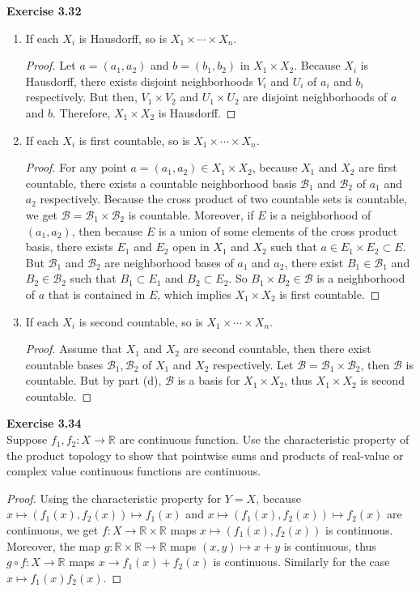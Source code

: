 \documentclass[12pt, a4paper]{article}
\theoremstyle{plain}
\newcommand{\B}{\mathscr{B}}
\newcommand{\R}{\mathbb{R}}
\newenvironment{exercise}[2][Exercise]
    { \begin{mdframed}[backgroundcolor=gray!20] \textbf{#1 #2} \\}
    {  \end{mdframed}}
\begin{document}
\begin{exercise}{3.32}
\begin{enumerate}[label=(\alph*)]
\begin{proof}
	\end{proof}

\item If each $X_i$ is Hausdorff, so is $X_1\times\cdots\times X_n$.
	\begin{proof}
	Let $a=(a_1,a_2)$ and $b=(b_1,b_2)$ in $X_1\times X_2$. Because $X_i$ is Hausdorff, there exists disjoint neighborhoods $V_i$ and $U_i$ of $a_i$ and $b_i$ respectively. But then, $V_1\times V_2$ and $U_1\times U_2$ are disjoint neighborhoods of $a$ and $b$. Therefore, $X_1\times X_2$ is Hausdorff.
	\end{proof}

\item If each $X_i$ is first countable, so is $X_1\times\cdots\times X_n$.
	\begin{proof}
	For any point $a=(a_1,a_2)\in X_1\times X_2$, because $X_1$ and $X_2$ are first countable, there exists a countable neighborhood basis $\B_1$ and $\B_2$ of $a_1$ and $a_2$ respectively. Because the cross product of two countable sets is countable, we get $\B=\B_1\times \B_2$ is countable. Moreover, if $E$ is a neighborhood of $(a_1,a_2)$, then because $E$ is a union of some elements of the cross product basis, there exists $E_1$ and $E_2$ open in $X_1$ and $X_2$ such that $a\in E_1\times E_2\subset E$. But $\B_1$ and $\B_2$ are neighborhood bases of $a_1$ and $a_2$, there exist $B_1\in\B_1$ and $B_2\in\B_2$ such that $B_1\subset E_1$ and $B_2\subset E_2$. So $B_1\times B_2\in\B$ is a neighborhood of $a$ that is contained in $E$, which implies $X_1\times X_2$ is first countable.
	\end{proof}

\item If each $X_i$ is second countable, so is $X_1\times\cdots\times X_n$.
	\begin{proof}
	Assume that $X_1$ and $X_2$ are second countable, then there exist countable bases $\B_1,\B_2$ of $X_1$ and $X_2$ respectively. Let $\B=\B_1\times \B_2$, then $\B$ is countable. But by part (d), $\B$ is a basis for $X_1\times X_2$, thus $X_1\times X_2$ is second countable.
	\end{proof}
\end{enumerate}
\end{exercise}

\begin{exercise}{3.34}
Suppose $f_1,f_2:X\rightarrow\R$ are continuous function. Use the characteristic property of the product topology to show that pointwise sums and products of real-value or complex value continuous functions are continuous.
\end{exercise}
	\begin{proof}
	Using the characteristic property for $Y=X$, because $x\mapsto (f_1(x),f_2(x))\mapsto f_1(x)$ and $x\mapsto(f_1(x),f_2(x))\mapsto f_2(x)$ are continuous, we get $f:X\rightarrow \R\times\R$ maps $ x\mapsto (f_1(x),f_2(x))$ is continuous. Moreover, the map $g:\R\times\R\rightarrow \R$ maps $(x,y)\mapsto x+y$ is continuous, thus $g\circ f:X\rightarrow\R$ maps $x\rightarrow f_1(x)+f_2(x)$ is continuous. Similarly for the case $x\mapsto f_1(x)f_2(x)$.
	\end{proof}
	
\end{document}
